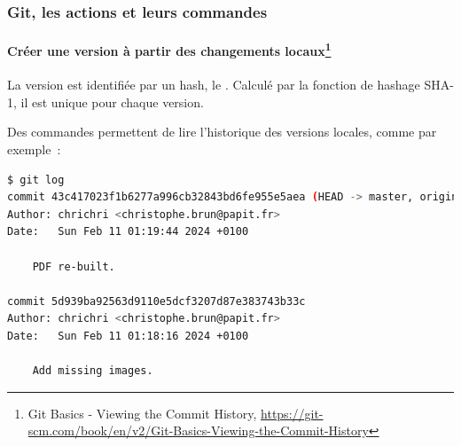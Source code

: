 \documentclass{beamer}
\begin{document}
    \begin{frame}[fragile]
        \frametitle{Git, les actions et leurs commandes}
        \framesubtitle{Créer une version à partir des changements locaux\footnote{Git Basics - Viewing the Commit History, \url{https://git-scm.com/book/en/v2/Git-Basics-Viewing-the-Commit-History}}}
        \transdissolve

        La version est identifiée par un hash, le .
        Calculé par la fonction de hashage SHA-1, il est unique pour chaque version.

        Des commandes permettent de lire l'historique des versions locales, comme par exemple~:
        \begin{lstlisting}[language=sh]
$ git log
commit 43c417023f1b6277a996cb32843bd6fe955e5aea (HEAD -> master, origin/master)
Author: chrichri <christophe.brun@papit.fr>
Date:   Sun Feb 11 01:19:44 2024 +0100

    PDF re-built.

commit 5d939ba92563d9110e5dcf3207d87e383743b33c
Author: chrichri <christophe.brun@papit.fr>
Date:   Sun Feb 11 01:18:16 2024 +0100

    Add missing images.
        \end{lstlisting}
    \end{frame}
\end{document}
